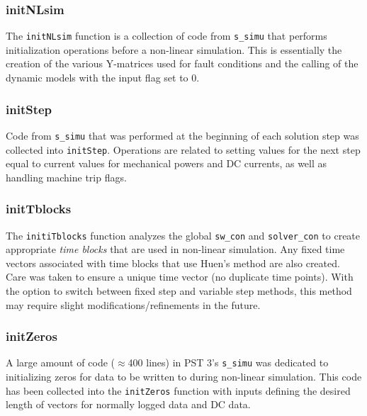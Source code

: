 \subsubsection{initNLsim}  
The \verb|initNLsim| function is a collection of code from \verb|s_simu| that performs initialization operations before a non-linear simulation.
This is essentially the creation of the various Y-matrices used for fault conditions and the calling of the dynamic models with the input flag set to 0.

\subsubsection{initStep}  
Code from \verb|s_simu| that was performed at the beginning of each solution step was collected into \verb|initStep|.
Operations are related to setting values for the next step equal to current values for mechanical powers and DC currents, as well as handling machine trip flags.

\subsubsection{initTblocks}  
The \verb|initiTblocks| function analyzes the global \verb|sw_con| and \verb|solver_con| to create appropriate \emph{time blocks} that are used in non-linear simulation.
Any fixed time vectors associated with time blocks that use Huen's method are also created.
Care was taken to ensure a unique time vector (no duplicate time points).
With the option to switch between fixed step and variable step  methods, this method may require slight modifications/refinements in the future.

\subsubsection{initZeros}  
A large amount of code ($\approx$400 lines) in PST 3's \verb|s_simu| was dedicated to initializing zeros for data to be written to during non-linear simulation.
This code has been collected into the \verb|initZeros| function with inputs defining the desired length of vectors for normally logged data and DC data.

